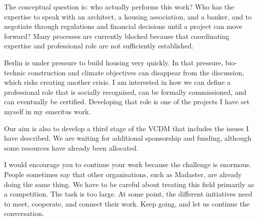 The conceptual question is: who actually performs this work? Who has the expertise to speak with an architect, a housing association, and a banker, and to negotiate through regulations and financial decisions until a project can move forward? Many processes are currently blocked because that coordinating expertise and professional role are not sufficiently established.

Berlin is under pressure to build housing very quickly. In that pressure, bio-technic construction and climate objectives can disappear from the discussion, which risks creating another crisis. I am interested in how we can define a professional role that is socially recognised, can be formally commissioned, and can eventually be certified. Developing that role is one of the projects I have set myself in my emeritus work.

Our aim is also to develop a third stage of the VCDM that includes the issues I have described. We are waiting for additional sponsorship and funding, although some resources have already been allocated.

I would encourage you to continue your work because the challenge is enormous. People sometimes say that other organisations, such as Madaster, are already doing the same thing. We have to be careful about treating this field primarily as a competition. The task is too large. At some point, the different initiatives need to meet, cooperate, and connect their work. Keep going, and let us continue the conversation.

